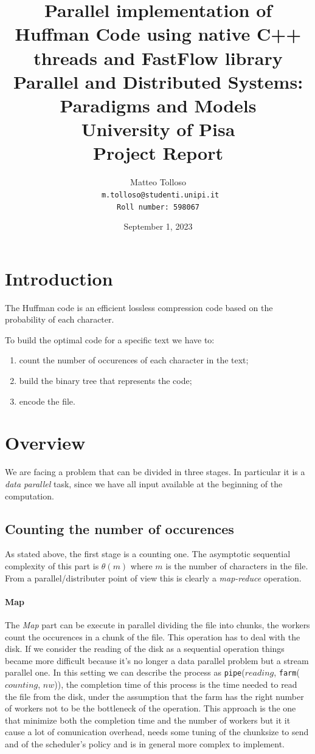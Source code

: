 \documentclass[12pt, letterpaper]{article}
\title{\vspace{2cm}\textbf{Parallel implementation of Huffman Code using native C++ threads and FastFlow library} \\
        \bigskip
        \Large{
            \medskip
            Parallel and Distributed Systems: Paradigms and Models \\
            \medskip
            University of Pisa \\
            \medskip
            Project Report\\
            \medskip
        }
}
\author{
  {Matteo Tolloso}\\
  \texttt{ \scriptsize{m.tolloso@studenti.unipi.it}}\\
  \texttt{\scriptsize{Roll number: 598067}} \\
}
\begin{document}
\nocite{*}
\date{September 1, 2023}
\maketitle

\newpage

\section{Introduction}
The Huffman code is an efficient lossless compression code based on the probability of each character.

To build the optimal code for a specific text we have to:
\begin{enumerate}
    \item count the number of occurences of each character in the text;
    \item build the binary tree that represents the code;
    \item encode the file.
\end{enumerate}

\section{Overview}

We are facing a problem that can be divided in three stages. In particular it is a \textit{data parallel} task, since we have all input available at the beginning of the computation.

\subsection{Counting the number of occurences}
As stated above, the first stage is a counting one. The asymptotic sequential complexity of this part is $\theta(m)$ where $m$ is the number of characters in the file.
From a parallel/distributer point of view this is clearly a \textit{map-reduce} operation.

\paragraph*{Map}
The \textit{Map} part can be execute in parallel dividing the file into chunks, the workers count the occurences in a chunk of the file. 
This operation has to deal with the disk. If we consider the reading of the disk as a sequential operation things became more difficult because it's no longer a data parallel problem but a stream parallel one. In this setting we can describe the process as \texttt{pipe}($reading$, \texttt{farm}($counting$, $nw$)), the completion time of this process is the time needed to read the file from the disk, under the assumption that the farm has the right number of workers not to be the bottleneck of the operation. This approach is the one that minimize both the completion time and the number of workers but it it cause a lot of comunication overhead, needs some tuning of the chunksize to send and of the scheduler's policy and is in general more complex to implement.
\end{document}
